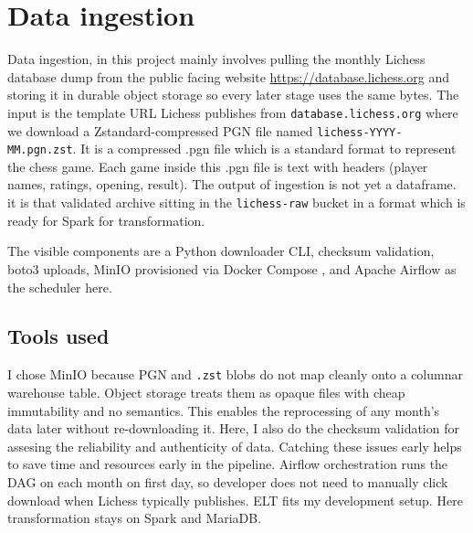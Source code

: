 \section{Data ingestion}
\label{sec:ingestion}
Data ingestion, in this project mainly involves pulling the monthly Lichess database dump from the public facing website \url{https://database.lichess.org} and storing it in durable object storage so every later stage uses the same bytes. The input is the template URL Lichess publishes from \texttt{database.lichess.org} where we download a Zstandard-compressed PGN file \parencite{zstandard} named \texttt{lichess-YYYY-MM.pgn.zst}. It is a compressed .pgn file which is a standard format to represent the chess game. Each game inside this .pgn file is text with headers (player names, ratings, opening, result). The output of ingestion is not yet a dataframe. it is that validated archive sitting in the \texttt{lichess-raw} bucket \parencite{minio} in a format which is ready for Spark for transformation. 

The visible components are a Python downloader CLI, checksum validation, boto3 uploads, MinIO provisioned via Docker Compose , and Apache Airflow \parencite{apache_airflow} as the scheduler here.

\subsection{Tools used}

I chose MinIO because PGN and \texttt{.zst} blobs do not map cleanly onto a columnar warehouse table. Object storage treats them as opaque files with cheap immutability and no semantics. This enables the reprocessing of any month's data later without re-downloading it. Here, I also do the checksum validation for assesing the reliability and authenticity of data. Catching these issues early helps to save time and resources early in the pipeline. Airflow orchestration runs the DAG on each month on first day, so developer does not need to manually click download when Lichess typically publishes. ELT fits my development setup. Here transformation stays on Spark and MariaDB.



